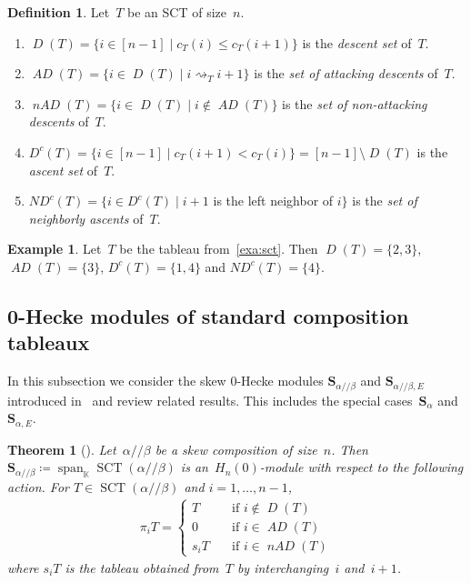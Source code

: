 \documentclass[10pt]{amsart}
\newtheorem{thm}{Theorem}[section]
\theoremstyle{plain}
\theoremstyle{plain}
\theoremstyle{plain}
\theoremstyle{plain}
\theoremstyle{plain}
\theoremstyle{definition}
\newtheorem{defi}[defi]{Definition}
\theoremstyle{definition}
\newtheorem{exam}[exam]{Example}
\newcommand{\bs}[1]{\boldsymbol{#1} }
\newcommand{\K}{\mathbb K}
\newcommand{\D}{\operatorname{\mathit{D}}}
\newcommand{\DC}{\operatorname{\mathit{D^c}}}
\newcommand{\AD}{\operatorname{\mathit{AD}}}
\newcommand{\nAD}{\operatorname{\mathit{nAD}}}
\newcommand{\ND}{\operatorname{\mathit{ND^c}}}
\DeclareMathOperator{\SCT}{SCT}
\newcommand{\myif}{\quad \text {if }}
\newcommand{\spa}{\operatorname{span}}
\newcommand{\He}{H_n(0)}
\newcommand{\ab}{{\alpha / \! \! / \beta}}
\newcommand{\att}{\rightsquigarrow}
\newcommand{\sa}{\bs S_{\alpha}}
\newcommand{\sab}{\bs S_{\ab}}
\newcommand{\se}{\bs S_{\alpha,E}}
\newcommand{\sse}{\bs S_{\ab,E}}
\begin{document}
\begin{defi}
	\label{thm:descents}
	 Let~$T$ be an SCT of size~$n$.
	\begin{enumerate}
		\item $\D(T) = \{i\in [n-1] \mid c_T(i) \leq c_T(i+1)\}$ is the \emph{descent set} of~$T$.
		\item $\AD(T) = \{i\in \D(T) \mid i\att_T i+1 \}$ is the \emph{set of attacking descents} of~$T$.
		\item $\nAD(T) = \{i\in \D(T) \mid i \notin \AD(T) \}$ is the \emph{set of non-attacking descents} of~$T$.
		\item[(1$'$)] $\DC(T) = \{i\in [n-1] \mid c_T(i+1) < c_T(i)\} = [n-1]\setminus \D(T)$ is the \emph{ascent set} of~$T$.
		\item[(2$'$)] $\ND(T) = \{i\in \DC(T) \mid i+1$ is the left neighbor of $i\}$ is the \emph{set of neighborly ascents} of~$T$.
	\end{enumerate}
\end{defi}

\begin{exam}
Let~$T$ be the tableau from~\cref{exa:sct}. Then
	$\D(T) = \{2,3\}$, 
	$\AD(T) = \{3\}$, 
	$\DC(T) =\{1,4\}$ and
	$\ND(T) = \{4\}$. 
\end{exam}


\subsection{0-Hecke modules of standard composition tableaux}

In this subsection we consider the skew 0-Hecke modules $\sab$ and $\sse$ introduced in~\cite{Tewari2015} and review related results. This includes the special cases~$\sa$ and~$\se$.

\begin{thm}[{\cite[Theorem~9.8]{Tewari2015}}]
	\label{thm:sct_modules}
	Let~$\ab$ be a skew composition of size~$n$. 
	Then $\sab\coloneqq \spa_\K \SCT(\ab)$ is an~$\He$-module with respect to the following action. For $T\in \SCT(\ab)$ and $i=1,\dots, n-1$,
	\begin{align*}
	\pi_i T = 
	\begin{cases}
	T &\myif i \notin \D(T) \\
	0 &\myif i \in \AD(T) \\ 
	s_iT &\myif i \in \nAD(T) 
	\end{cases}
	\end{align*}
	where $s_iT$ is the tableau obtained from~$T$ by interchanging~$i$ and~$i+1$.
\end{thm}
\end{document}
